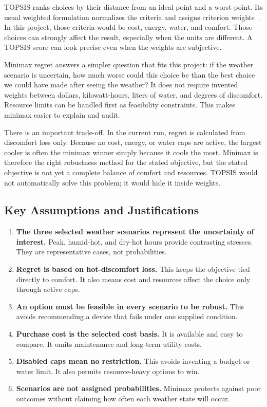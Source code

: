 TOPSIS ranks choices by their distance from an ideal point and a worst point. Its usual weighted formulation normalizes the criteria and assigns criterion weights~\cite{hwang_yoon1981}. In this project, those criteria would be cost, energy, water, and comfort. Those choices can strongly affect the result, especially when the units are different. A TOPSIS score can look precise even when the weights are subjective.
 
Minimax regret answers a simpler question that fits this project: if the weather scenario is uncertain, how much worse could this choice be than the best choice we could have made after seeing the weather? It does not require invented weights between dollars, kilowatt-hours, liters of water, and degrees of discomfort. Resource limits can be handled first as feasibility constraints. This makes minimax easier to explain and audit.
 
There is an important trade-off. In the current run, regret is calculated from discomfort loss only. Because no cost, energy, or water caps are active, the largest cooler is often the minimax winner simply because it cools the most. Minimax is therefore the right robustness method for the stated objective, but the stated objective is not yet a complete balance of comfort and resources. TOPSIS would not automatically solve this problem; it would hide it inside weights.
 
\subsection{Key Assumptions and Justifications}
 
\begin{enumerate}
  \item \textbf{The three selected weather scenarios represent the uncertainty of interest.} Peak, humid-hot, and dry-hot hours provide contrasting stresses. They are representative cases, not probabilities.
  \item \textbf{Regret is based on hot-discomfort loss.} This keeps the objective tied directly to comfort. It also means cost and resources affect the choice only through active caps.
  \item \textbf{An option must be feasible in every scenario to be robust.} This avoids recommending a device that fails under one supplied condition.
  \item \textbf{Purchase cost is the selected cost basis.} It is available and easy to compare. It omits maintenance and long-term utility costs.
  \item \textbf{Disabled caps mean no restriction.} This avoids inventing a budget or water limit. It also permits resource-heavy options to win.
  \item \textbf{Scenarios are not assigned probabilities.} Minimax protects against poor outcomes without claiming how often each weather state will occur.
\end{enumerate}
